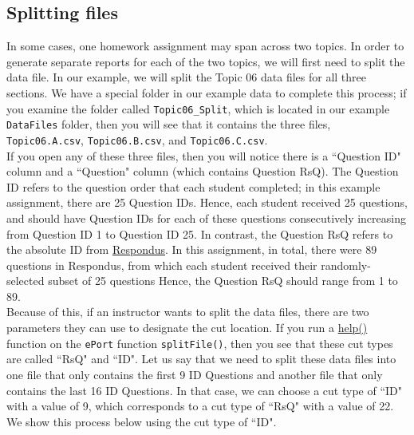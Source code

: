 \documentclass{article}\usepackage[]{graphicx}\usepackage[]{color}
\numberwithin{equation}{section} %
\begin{document}
\subsection{Splitting files}

In some cases, one homework assignment may span across two topics. In order to generate separate reports for each of the two topics, we will first need to split the data file. In our example, we will split the Topic 06 data files for all three sections. We have a special folder in our example data to complete this process; if you examine the folder called \texttt{Topic06\_Split}, which is located in our example \texttt{DataFiles} folder, then you will see that it contains the three files, \texttt{Topic06.A.csv}, \texttt{Topic06.B.csv}, and \texttt{Topic06.C.csv}. \\

If you open any of these three files, then you will notice there is a ``Question ID" column and a ``Question" column (which contains Question RsQ). The Question ID refers to the question order that each student completed; in this example assignment, there are 25 Question IDs. Hence, each student received 25 questions, and should have Question IDs for each of these questions consecutively increasing from Question ID 1 to Question ID 25. In contrast, the Question RsQ refers to the absolute ID from \hyperref[sec:ResSection]{Respondus}. In this assignment, in total, there were 89 questions in Respondus, from which each student received their randomly-selected subset of 25 questions Hence, the Question RsQ should range from 1 to 89. \\

Because of this, if an instructor wants to split the data files, there are two parameters they can use to designate the cut location. If you run a \hyperref[sec:helpSection]{help()} function on the \texttt{ePort} function \texttt{splitFile()}, then you see that these cut types are called ``RsQ" and ``ID". Let us say that we need to split these data files into one file that only contains the first 9 ID Questions and another file that only contains the last 16 ID Questions. In that case, we can choose a cut type of ``ID" with a value of 9, which corresponds to a cut type of ``RsQ" with a value of 22. We show this process below using the cut type of ``ID".
\end{document}
